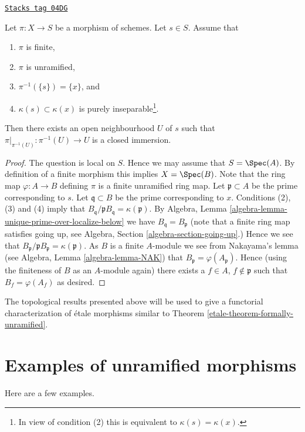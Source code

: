 \begin{lemma}
\label{etale-lemma-finite-unramified-one-point}
\href{https://stacks.math.columbia.edu/tag/04DG}{\texttt{Stacks tag 04DG}}

Let $\pi : X \to S$ be a morphism of schemes. Let $s \in S$.
Assume that
\begin{enumerate}
\item $\pi$ is finite,
\item $\pi$ is unramified,
\item $\pi^{-1}(\{s\}) = \{x\}$, and
\item $\kappa(s) \subset \kappa(x)$ is purely
inseparable\footnote{In view of condition (2)
this is equivalent to $\kappa(s) = \kappa(x)$.}.
\end{enumerate}
Then there exists an open neighbourhood $U$ of $s$ such that
$\pi|_{\pi^{-1}(U)} : \pi^{-1}(U) \to U$ is a closed immersion.
\end{lemma}

\begin{proof}
The question is local on $S$. Hence we may assume that $S = \Spec(A)$.
By definition of a finite morphism this implies $X = \Spec(B)$.
Note that the ring map $\varphi : A \to B$ defining $\pi$
is a finite unramified ring map.
Let $\mathfrak p \subset A$ be the prime corresponding to $s$.
Let $\mathfrak q \subset B$ be the prime corresponding to $x$.
Conditions (2), (3) and (4) imply that
$B_{\mathfrak q}/\mathfrak pB_{\mathfrak q} = \kappa(\mathfrak p)$.
By Algebra, Lemma \ref{algebra-lemma-unique-prime-over-localize-below}
we have $B_{\mathfrak q} = B_{\mathfrak p}$
(note that a finite ring map satisfies going up, see
Algebra, Section \ref{algebra-section-going-up}.)
Hence we see that
$B_{\mathfrak p}/\mathfrak pB_{\mathfrak p} = \kappa(\mathfrak p)$.
As $B$ is a finite $A$-module we see from Nakayama's lemma (see
Algebra, Lemma \ref{algebra-lemma-NAK})
that $B_{\mathfrak p} = \varphi(A_{\mathfrak p})$. Hence (using the finiteness
of $B$ as an $A$-module again) there exists a
$f \in A$, $f \not \in \mathfrak p$ such that $B_f = \varphi(A_f)$
as desired.
\end{proof}

The topological results presented above will be used to give a functorial
characterization of \'etale morphisms similar to Theorem
\ref{etale-theorem-formally-unramified}.

\section{Examples of unramified morphisms}
\label{etale-section-examples}
Here are a few examples.


